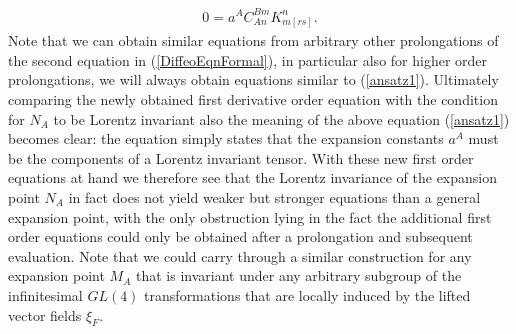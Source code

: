 \documentclass[a4paper,12pt, DIV=14, BCOR=5mm, twoside, headsepline, numbers=noenddot]{scrbook}
\begin{document}
\begin{align}\label{ansatz1}
    0 = a^A C^{Bm}_{An}  K_{m[rs]}^n.
\end{align}
Note that we can obtain similar equations from arbitrary other prolongations of the second equation in (\ref{DiffeoEqnFormal}), in particular also for higher order prolongations, we will always obtain equations similar to (\ref{ansatz1}). Ultimately comparing the newly obtained first derivative order equation with the condition for $N_A$ to be Lorentz invariant also the meaning of the above equation (\ref{ansatz1}) becomes clear: the equation simply states that the expansion constants $a^A$ must be the components of a Lorentz invariant tensor. With these new first order equations at hand we therefore see that the Lorentz invariance of the expansion point $N_A$ in fact does not yield weaker but stronger equations than a general expansion point, with the only obstruction lying in the fact the additional first order equations could only be obtained after a prolongation and subsequent evaluation. Note that we could carry through a similar construction for any expansion point $M_A$ that is invariant under any arbitrary subgroup of the infinitesimal $GL(4)$ transformations that are locally induced by the lifted vector fields $\xi_F$. \\
\end{document}
